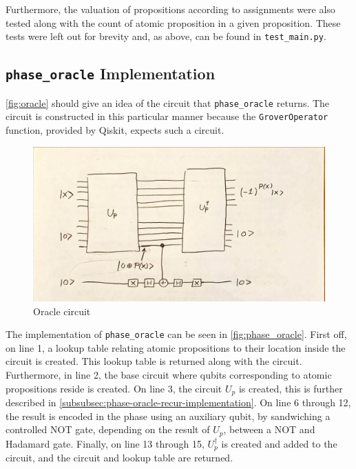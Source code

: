 Furthermore, the valuation of propositions according to assignments were also tested along with the count of atomic proposition in a given proposition.
These tests were left out for brevity and, as above, can be found in \texttt{test\_main.py}.

\subsection{\texttt{phase\_oracle} Implementation}\label{subsec:phase-oracle}

\autoref{fig:oracle} should give an idea of the circuit that \texttt{phase\_oracle} returns.
The circuit is constructed in this particular manner because the \texttt{GroverOperator} function, provided by Qiskit, expects such a circuit.

\begin{figure}[H]
    \centering
    \includegraphics[width=\textwidth]{figures/garbage-free-computation.jpg}
    \caption{Oracle circuit}
    \label{fig:oracle}
\end{figure}

The implementation of \texttt{phase\_oracle} can be seen in \autoref{fig:phase_oracle}.
First off, on line 1, a lookup table relating atomic propositions to their location inside the circuit is created.
This lookup table is returned along with the circuit.
Furthermore, in line 2, the base circuit where qubits corresponding to atomic propositions reside is created.
On line 3, the circuit $U_p$ is created, this is further described in \autoref{subsubsec:phase-oracle-recur-implementation}.
On line 6 through 12, the result is encoded in the phase using an auxiliary qubit, by sandwiching a controlled NOT gate, depending on the result of $U_p$, between a NOT and Hadamard gate.
Finally, on line 13 through 15, $U_p^\dagger$ is created and added to the circuit, and the circuit and lookup table are returned.


